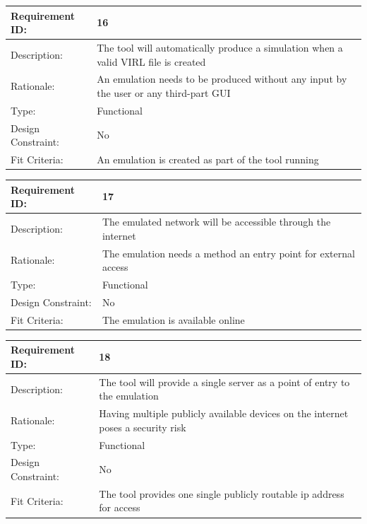 \documentclass[11pt]{report}
\begin{document}
\newline
\vspace*{0.5 cm}
\newline
\begin{tabular}{|l|p{12cm}|}
	\hline Requirement ID: & 16 \\ 
	\hline Description: & The tool will automatically produce a simulation when a valid VIRL file is created  \\ 
	\hline Rationale: & An emulation needs to be produced without any input by the user or any third-part GUI \\ 
	\hline Type: & Functional \\ 
	\hline Design Constraint: & No \\ 
	\hline Fit Criteria: & An emulation is created as part of the tool running  \\ 
	\hline 
\end{tabular}
\newline
\vspace*{0.5 cm}
\newline
\begin{tabular}{|l|p{12cm}|}
	\hline Requirement ID: & 17 \\ 
	\hline Description: & The emulated network will be accessible through the internet  \\ 
	\hline Rationale: & The emulation needs a method an entry point for external access \\ 
	\hline Type: & Functional \\ 
	\hline Design Constraint: & No \\ 
	\hline Fit Criteria: & The emulation is available online  \\ 
	\hline 
\end{tabular}
\newline
\vspace*{0.5 cm}
\newline
\begin{tabular}{|l|p{12cm}|}
	\hline Requirement ID: & 18 \\ 
	\hline Description: & The tool will provide a single server as a point of entry to the emulation  \\ 
	\hline Rationale: & Having multiple publicly available devices on the internet poses a security risk \\ 
	\hline Type: & Functional \\ 
	\hline Design Constraint: & No \\ 
	\hline Fit Criteria: & The tool provides one single publicly routable ip address for access  \\ 
	\hline 
\end{tabular}
\end{document}
